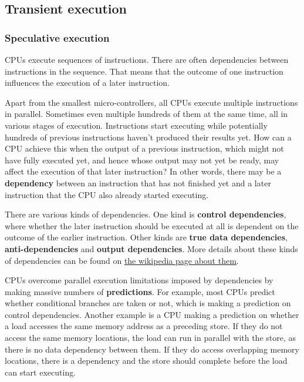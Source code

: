 \documentclass[
  a4paper,
]{report}
\begin{document}
\subsection{Transient execution}\label{transient-execution}

\subsubsection{Speculative execution}\label{speculative-execution}

CPUs execute sequences of instructions. There are often dependencies
between instructions in the sequence. That means that the outcome of one
instruction influences the execution of a later instruction.

Apart from the smallest micro-controllers, all CPUs execute multiple
instructions in parallel. Sometimes even multiple hundreds of them at
the same time, all in various stages of execution. Instructions start
executing while potentially hundreds of previous instructions haven't
produced their results yet. How can a CPU achieve this when the output
of a previous instruction, which might not have fully executed yet, and
hence whose output may not yet be ready, may affect the execution of
that later instruction? In other words, there may be a
\textbf{dependency} between an instruction that has not finished yet and
a later instruction that the CPU also already started executing.

There are various kinds of dependencies. One kind is
\textbf{\label{__index_entry_164}{control
dependencies}}, where whether the later
instruction should be executed at all is dependent on the outcome of the
earlier instruction. Other kinds are
\textbf{\label{__index_entry_165}{true data
dependencies}},
\textbf{\label{__index_entry_166}{anti-dependencies}}
and \textbf{\label{__index_entry_167}{output
dependencies}}. More details about these kinds
of dependencies can be found on
\href{https://en.wikipedia.org/wiki/Data_dependency}{the wikipedia page
about them}.

CPUs overcome parallel execution limitations imposed by dependencies by
making massive numbers of
\textbf{\label{__index_entry_168}{predictions}}.
For example, most CPUs predict whether conditional branches are taken or
not, which is making a prediction on control dependencies. Another
example is a CPU making a prediction on whether a load accesses the same
memory address as a preceding store. If they do not access the same
memory locations, the load can run in parallel with the store, as there
is no data dependency between them. If they do access overlapping memory
locations, there is a dependency and the store should complete before
the load can start executing.
\end{document}
